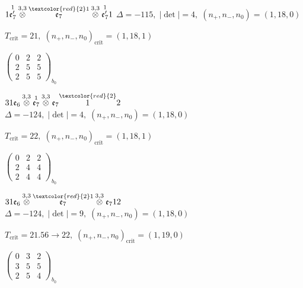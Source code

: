 \documentclass[10pt]{article}
\begin{document}
$1\overset{1}{\mathfrak{e}_7'}\overset{3,3}{\otimes}\overset{\textcolor{red}{2}1}{\mathfrak{e}_7}\overset{3,3}{\otimes}\overset{1}{\mathfrak{e}_7'}1$ \quad $\Delta=-115,\; |\det|=4,\; (n_+,n_-,n_0)=(1,18,0)$

\hspace{1em}$T_{\text{crit}}=21,\; (n_+,n_-,n_0)_{\text{crit}}=(1,18,1)$

\hspace{2em}$\left(\begin{smallmatrix}0 & 2 & 2 \\ 2 & 5 & 5 \\ 2 & 5 & 5\end{smallmatrix}\right)_{\!b_0}$

\smallskip

$31\mathfrak{e}_6\overset{3,3}{\otimes}\overset{1}{\mathfrak{e}_7}\overset{3,3}{\otimes}\mathfrak{e}_7\overset{\textcolor{red}{2}}{1}2$ \quad $\Delta=-124,\; |\det|=4,\; (n_+,n_-,n_0)=(1,18,0)$

\hspace{1em}$T_{\text{crit}}=22,\; (n_+,n_-,n_0)_{\text{crit}}=(1,18,1)$

\hspace{2em}$\left(\begin{smallmatrix}0 & 2 & 2 \\ 2 & 4 & 4 \\ 2 & 4 & 4\end{smallmatrix}\right)_{\!b_0}$

$31\mathfrak{e}_6\overset{3,3}{\otimes}\overset{\textcolor{red}{2}1}{\mathfrak{e}_7}\overset{3,3}{\otimes}\mathfrak{e}_712$ \quad $\Delta=-124,\; |\det|=9,\; (n_+,n_-,n_0)=(1,18,0)$

\hspace{1em}$T_{\text{crit}}=21.56 \to 22,\; (n_+,n_-,n_0)_{\text{crit}}=(1,19,0)$

\hspace{2em}$\left(\begin{smallmatrix}0 & 3 & 2 \\ 3 & 5 & 5 \\ 2 & 5 & 4\end{smallmatrix}\right)_{\!b_0}$

\smallskip
\end{document}
